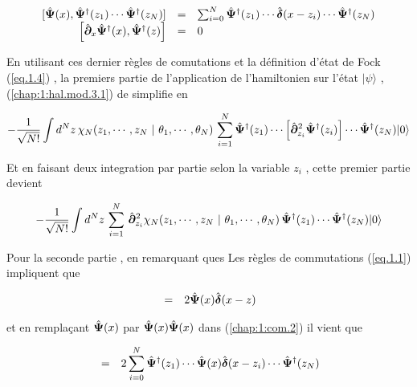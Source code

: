 \begin{eqnarray}
	\left . \begin{array}{rcl}
		[ \hat{\bm{\Psi}}(x),  \hat{\bm{\Psi}}^\dag(z_1)\cdots \hat{\bm{\Psi}}^\dag(z_N)  ]  &=&  \sum_{i = 0}^{N} \hat{\bm{\Psi}}^\dag(z_1) \cdots \hat{\bm{\delta}}(x-z_i) \cdots \hat{\bm{\Psi}}^\dag(z_N)  \\
		\left [ \hat{\bm{\partial}}_x\hat{\bm{\Psi}}^\dag(x),  \hat{\bm{\Psi}}^\dag(z) \right ]   & =  & 0 
	\end{array} \right . \label{chap:1:com.2}
\end{eqnarray}


En utilisant ces dernier règles de comutations et la définition d'état de Fock (\ref{eq.1.4}) , la premiers partie de l'application de l'hamiltonien sur l'état $\vert \psi  \rangle$ , (\ref{chap:1:hal.mod.3.1}) de simplifie en 

\begin{eqnarray}
	 - \frac{1}{ \sqrt{N!}} \int d^N z \, \chi_N ( z_1 , \cdots , z_N  ~\vert ~ \theta_1 , \cdots , \theta _N ) \,	\sum_{i=1}^N  \hat{\bm{\Psi}}^\dag(z_1) \cdots \left [\hat{\bm{\partial}}_{z_i}^2 \hat{\bm{\Psi}}^\dag(z_i)\right ] \cdots\hat{\bm{\Psi}}^\dag(z_N) \vert 0 \rangle 	
\end{eqnarray}

Et en faisant deux integration par partie selon la variable $z_i$ , cette premier partie devient

\begin{eqnarray}
	 - \frac{1}{ \sqrt{N!}} \int d^N z \, \sum_{i=1}^N \, \hat{\bm{\partial}}_{z_i}^2\chi_N ( z_1 , \cdots , z_N  ~\vert ~ \theta_1 , \cdots , \theta _N ) \,	 \hat{\bm{\Psi}}^\dag(z_1)  \cdots\hat{\bm{\Psi}}^\dag(z_N) \vert 0 \rangle \label{chap:1:hal.mod.3.1.1}	
\end{eqnarray}

Pour la seconde partie  , en remarquant ques Les règles de commutations (\ref{eq.1.1}) impliquent que 

\begin{eqnarray}
	[ \operator{\Psi}(x) \operator{\Psi}(x),  \operator{\Psi}^\dag(z) ] & =& 2\operator{\Psi}(x)\operator{\delta}(x - z)\label{chap:1:com.3}  		
\end{eqnarray}

et en remplaçant $\hat{\bm{\Psi}}(x)$ par $\hat{\bm{\Psi}}(x)\hat{\bm{\Psi}}(x)$ dans  (\ref{chap:1:com.2}) il vient que  

\begin{eqnarray}
	[ \operator{\Psi}(x)\operator{\Psi}(x),  \operator{\Psi}^\dag(z_1)\cdots \operator{\Psi}^\dag(z_N)  ]  &=&  2\sum_{i = 0}^{N} \operator{\Psi}^\dag(z_1) \cdots  \operator{\Psi}(x)\operator{\delta}(x-z_i) \cdots \operator{\Psi}^\dag(z_N) \label{chap:1:com.4}		
\end{eqnarray}

